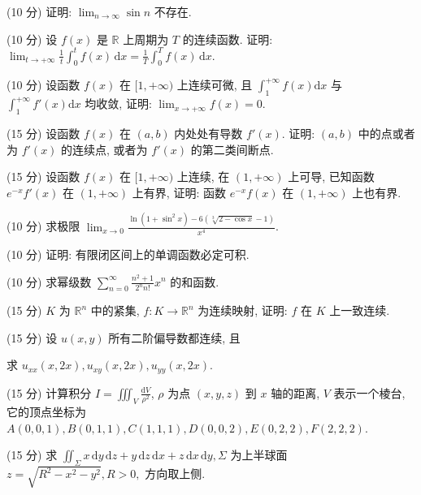 (10 分) 证明: $\lim_{n \to \infty} \sin n$ 不存在.\par
(10 分) 设 $f(x)$ 是 $\mathbb{R}$ 上周期为 $T$ 的连续函数. 证明: $\lim_{t \to +\infty} \frac{1}{t} \int_{0}^{t} f(x) \, \mathrm{d}x = \frac{1}{T} \int_{0}^{T} f(x) \, \mathrm{d}x$.\par
(10 分) 设函数 $f(x)$ 在 $[1, +\infty)$ 上连续可微, 且 $\int_{1}^{+\infty} f(x) \mathrm{d}x$ 与 $\int_{1}^{+\infty} f'(x) \mathrm{d}x$ 均收敛, 证明: $\lim_{x \to +\infty} f(x) = 0$.\par
(15 分) 设函数 $f(x)$ 在 $(a, b)$ 内处处有导数 $f'(x)$. 证明: $(a, b)$ 中的点或者为 $f'(x)$ 的连续点, 或者为 $f'(x)$ 的第二类间断点.\par
(15 分) 设函数 $f(x)$ 在 $[1, +\infty)$ 上连续, 在 $(1, +\infty)$ 上可导, 已知函数 $e^{-x}f'(x)$ 在 $(1, +\infty)$ 上有界, 证明: 函数 $e^{-x}f(x)$ 在 $(1, +\infty)$ 上也有界.\par
(10 分) 求极限 $\lim_{x\to 0}\frac{\ln(1 + \sin^2 x) - 6(\sqrt[3]{2 - \cos x} - 1)}{x^4}$.\par
(10 分) 证明: 有限闭区间上的单调函数必定可积.\par
(10 分) 求幂级数 $\sum_{n=0}^{\infty} \frac{n^2 + 1}{2^n n!} x^n$ 的和函数.\par
(15 分) $K$ 为 $\mathbb{R}^n$ 中的紧集, $f: K \to \mathbb{R}^n$ 为连续映射, 证明: $f$ 在 $K$ 上一致连续.\par
\par{}
(15 分) 设 $u(x, y)$ 所有二阶偏导数都连续, 且\par
\nopagebreak[4]
求 $u_{xx}(x,2x), u_{xy}(x,2x), u_{yy}(x,2x)$.\par
(15 分) 计算积分 $I = \iiint_{V} \frac{\mathrm{d}V}{\rho^2}$, $\rho$ 为点 $(x, y, z)$ 到 $x$ 轴的距离, $V$ 表示一个棱台, 它的顶点坐标为 $A(0,0,1), B(0,1,1), C(1,1,1), D(0,0,2), E(0,2,2), F(2,2,2)$.\par
(15 分) 求 $\iint_{\Sigma} x \, \mathrm{d}y \, \mathrm{d}z + y \, \mathrm{d}z \, \mathrm{d}x + z \, \mathrm{d}x \, \mathrm{d}y,$$\Sigma$ 为上半球面 $z = \sqrt{R^2 - x^2 - y^2}, R > 0,$ 方向取上侧.\par
